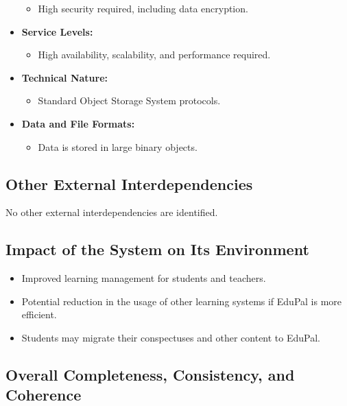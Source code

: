 \begin{itemize}
          \begin{itemize}
              \item High security required, including data encryption.
          \end{itemize}
    \item \textbf{Service Levels:}
          \begin{itemize}
              \item High availability, scalability, and performance required.
          \end{itemize}
    \item \textbf{Technical Nature:}
          \begin{itemize}
              \item Standard Object Storage System protocols.
          \end{itemize}
    \item \textbf{Data and File Formats:}
          \begin{itemize}
              \item Data is stored in large binary objects.
          \end{itemize}
\end{itemize}


\subsection{Other External Interdependencies}

No other external interdependencies are identified.


\subsection{Impact of the System on Its Environment}

\begin{itemize}
    \item Improved learning management for students and teachers.
    \item Potential reduction in the usage of other learning systems if EduPal is more efficient.
    \item Students may migrate their conspectuses and other content to EduPal.
\end{itemize}


\subsection{Overall Completeness, Consistency, and Coherence}

